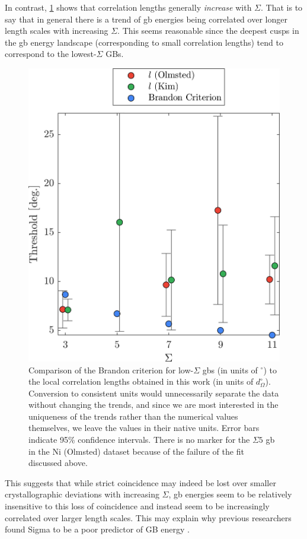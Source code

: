 \documentclass[final,twocolumn,12pt]{elsarticle}
\begin{document}
    In contrast, \cref{fig:brandoncriterioncomparison} shows that correlation lengths generally \emph{increase} with $\Sigma$. That is to say that in general there is a trend of \gls{gb} energies being correlated over longer length scales with increasing $\Sigma$. This seems reasonable since the deepest cusps in the \gls{gb} energy landscape (corresponding to small correlation lengths) tend to correspond to the lowest-$\Sigma$ GBs.
    \begin{figure}
        \centering
        \includegraphics[scale=1]{figures/BrandonCriterionComparison.png}
        \caption{Comparison of the Brandon criterion \cite{brandonStructureHighangleGrain1966a} for low-$\Sigma$ \glspl{gb} (in units of ${}^{\circ}$) to the local correlation lengths obtained in this work (in units of $d_{\Omega}^{\circ}$). Conversion to consistent units would unnecessarily separate the data without changing the trends, and since we are most interested in the uniqueness of the trends rather than the numerical values themselves, we leave the values in their native units. Error bars indicate 95\% confidence intervals. There is no marker for the $\Sigma 5$ \gls{gb} in the Ni (Olmsted) dataset because of the failure of the fit discussed above.}
        \label{fig:brandoncriterioncomparison}
    \end{figure}
    This suggests that while strict coincidence may indeed be lost over smaller crystallographic deviations with increasing $\Sigma$, \gls{gb} energies seem to be relatively insensitive to this loss of coincidence and instead seem to be increasingly correlated over larger length scales. This may explain why previous researchers found Sigma to be a poor predictor of GB energy \cite{kingWhatDoesIt2006}. %
\end{document}
